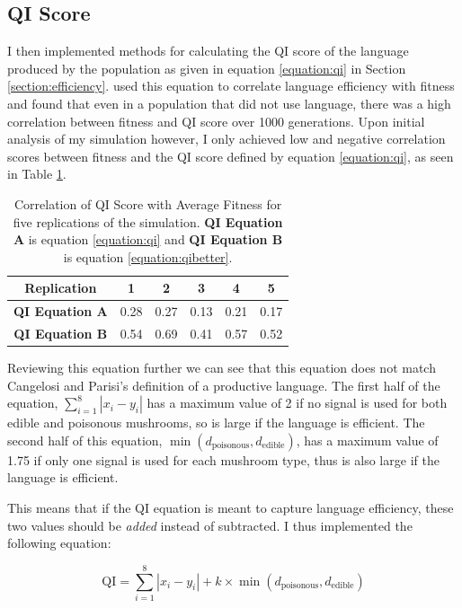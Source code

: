 \documentclass[12pt,a4paper,twoside,openright]{report}
\begin{document}
\subsection{QI Score}

I then implemented methods for calculating the QI score of the language produced by the population as given in equation \ref{equation:qi} in Section \ref{section:efficiency}. \citet{Cangelosi1998} used this equation to correlate language efficiency with fitness and found that even in a population that did not use language, there was a high correlation between fitness and QI score over 1000 generations. Upon initial analysis of my simulation however, I only achieved low and negative correlation scores between fitness and the QI score defined by equation \ref{equation:qi}, as seen in Table \ref{table:qi-correlation}.

\begin{table}[t]
\centering
 \begin{tabular}{ c || c | c | c | c | c}
 \bf{Replication} & \bf{1} & \bf{2} & \bf{3} & \bf{4} & \bf{5}\\
 \hline
  \hline
\bf {QI Equation A} & 0.28 & 0.27 & 0.13 & 0.21 & 0.17 \\
 \hline
\bf {QI Equation B} & 0.54 & 0.69 & 0.41 & 0.57 & 0.52 \\
\end{tabular}
\caption{Correlation of QI Score with Average Fitness for five replications of the simulation. {\bf QI Equation A} is equation \ref{equation:qi} and {\bf QI Equation B} is equation \ref{equation:qibetter}.}
\label{table:qi-correlation}
\end{table}

Reviewing this equation further we can see that this equation does not match Cangelosi and Parisi's  definition of a productive language. The first half of the equation, $\sum^{8}_{i = 1} |x_i - y_i|$ has a maximum value of 2 if no signal is used for both edible and poisonous mushrooms, so is large if the language is efficient. The second half of this equation, $\min (d_{\mathrm{poisonous}}, d_{\mathrm{edible}})$, has a maximum value of 1.75 if only one signal is used for each mushroom type, thus is also large if the language is efficient. 

This means that if the QI equation is meant to capture language efficiency, these two values should be \emph{added} instead of subtracted. I thus implemented the following equation:

\begin{equation}
\label{equation:qibetter}
\mathrm{QI} = \sum^{8}_{i = 1} |x_i - y_i| + k \times \min (d_{\mathrm{poisonous}}, d_{\mathrm{edible}})
\end{equation}
\end{document}
